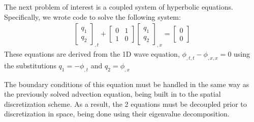 
The next problem of interest is a coupled system of hyperbolic equations.
Specifically, we wrote code to solve the following system:
\begin{align*}
	\begin{bmatrix}
		q_1\\
		q_2
	\end{bmatrix}_{,t} + 
	\begin{bmatrix}
		0 & 1 \\
		1 & 0
	\end{bmatrix}
	\begin{bmatrix}
		q_1 \\
		q_2
	\end{bmatrix}_{,x} = 
	\begin{bmatrix}
		0 \\
		0
	\end{bmatrix}
\end{align*}
These equations are derived from the 1D wave equation, $\phi_{,t,t} - \phi_{,x,x} = 0$ using the substitutions $q_1 = -\phi_{,t}$ and $q_2 = \phi_{,x}$

The boundary conditions of this equation must be handled in the same way as the previously solved advection equation, being built in to the spatial discretization scheme.
As a result, the 2 equations must be decoupled prior to discretization in space, being done using their eigenvalue decomposition.

